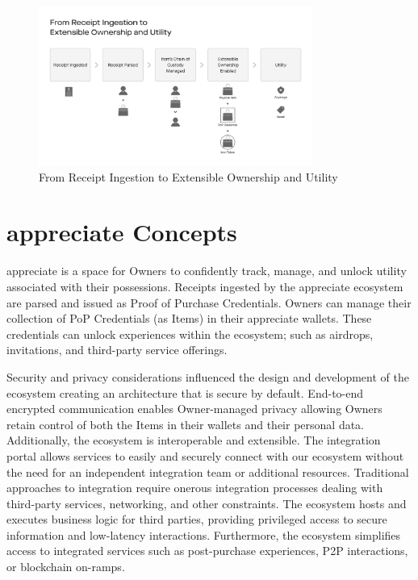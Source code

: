 \documentclass[a4paper,onecolumn, 10.5pt]{article}
\begin{document}
\begin{figure}[!htb]
	\centering %
		\includegraphics[clip, trim=0cm 2cm 0cm 7.5cm, width=0.80\textwidth]{./images/flowchart.pdf}
	\caption{From Receipt Ingestion to Extensible Ownership and Utility  }
	\label{fig: flowchart}
\end{figure}



\section {appreciate Concepts}

\begin{tcolorbox}[colback=gray!5!white,colframe=gray!50!black, title=appreciate experience for Item Owners]	
	appreciate is a space for Owners to confidently track, manage, and unlock utility associated with their possessions.  Receipts ingested by the appreciate ecosystem are parsed and issued as Proof of Purchase Credentials.  Owners can manage their collection of PoP Credentials (as Items) in their appreciate wallets. These credentials can unlock experiences within the ecosystem; such as airdrops, invitations, and third-party service offerings. 
\end{tcolorbox}


Security and privacy considerations influenced the design and development of the ecosystem creating an architecture that is secure by default. End-to-end encrypted communication enables Owner-managed privacy allowing Owners retain control of both the Items in their wallets and their personal data.
Additionally, the ecosystem is interoperable and extensible. The integration portal allows services to easily and securely connect with our ecosystem without the need for an independent integration team or additional resources. Traditional approaches to integration require onerous integration processes dealing with third-party services, networking, and other constraints. The ecosystem hosts and executes business logic for third parties, providing privileged access to secure information and low-latency interactions. Furthermore, the ecosystem simplifies access to integrated services such as post-purchase experiences, P2P interactions, or blockchain on-ramps. 
\end{document}
